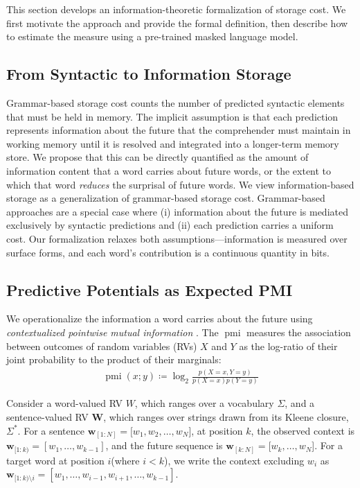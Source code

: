 \documentclass[11pt]{article}
\newcommand{\wseq}[2]{\ensuremath{\boldsymbol w_{[#1: #2]}}\xspace}
\newcommand{\curid}{\ensuremath{k}\xspace}
\newcommand{\sstartid}{\ensuremath{1}\xspace}
\newcommand{\sendid}{\ensuremath{N}\xspace}
\newcommand{\targetid}{\ensuremath{i}\xspace}
\newcommand{\wtarget}{\ensuremath{w_{\targetid}}\xspace}
\newcommand{\context}{\ensuremath{\boldsymbol w_{[\sstartid:\curid)}}\xspace}
\newcommand{\contextwotarget}{\ensuremath{\boldsymbol w_{[1:\curid)\setminus \targetid}}\xspace}
\newcommand{\sent}{\ensuremath{\wseq{\sstartid}{\sendid}}\xspace}
\newcommand{\future}{\ensuremath{\wseq{\curid}{\sendid}}\xspace}
\newcommand{\logtwo}{\ensuremath{\log_{2}}\xspace}
\newcommand{\pmi}{\ensuremath{\operatorname{pmi}}\xspace}
\begin{document}
This section develops an information-theoretic formalization of storage cost.
We first motivate the approach and provide the formal definition, then describe how to estimate the measure using a pre-trained masked language model.

\subsection{From Syntactic to Information Storage}


Grammar-based storage cost counts the number of predicted syntactic elements that must be held in memory.
The implicit assumption is that each prediction represents information about the future that the comprehender must maintain in working memory until it is resolved and integrated into a longer-term memory store.
We propose that this can be directly quantified as the amount of information content that a word carries about future words, or the extent to which that word \emph{reduces} the surprisal of future words.
We view information-based storage as a generalization of grammar-based storage cost.
Grammar-based approaches are a special case where (i) information about the future is mediated exclusively by syntactic predictions and (ii) each prediction carries a uniform cost.
Our formalization relaxes both assumptions---information is measured over surface forms, and each word's contribution is a continuous quantity in bits.


\subsection{Predictive Potentials as Expected PMI}
\label{sec:predinfo}
We operationalize the information a word carries about the future using \emph{contextualized pointwise mutual information} \citep[\pmi;][]{hoover-etal-2021-linguistic}.
The \pmi measures the association between outcomes of random variables (RVs) $X$ and $Y$ as the log-ratio of their joint probability to the product of their marginals:
\begin{align}
    \pmi(x;y) \coloneqq \logtwo\frac{p(X=x,Y=y)}{p(X=x)p(Y=y)}
\end{align}


Consider a word-valued RV $W$, which ranges over a vocabulary $\Sigma$, and a sentence-valued RV $\boldsymbol{W}$, which ranges over strings drawn from its Kleene closure, $\Sigma^*$.
For a sentence $\sent = [w_1, w_2, \ldots, w_N$], at position \curid, the observed context is $\context = [w_1, \ldots, w_{k-1}]$, and the future sequence is $\future = [w_k, \ldots, w_N$].
For a target word at position \targetid (where $\targetid < \curid$), we write the context excluding \wtarget as $\contextwotarget = [w_1, \ldots, w_{i-1}, w_{i+1}, \ldots, w_{k-1}]$.
\end{document}
